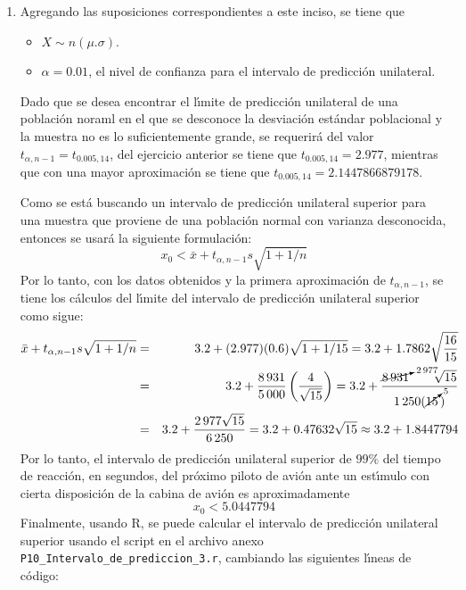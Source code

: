 \begin{solucion}
\begin{enumerate}
  \item Agregando las suposiciones correspondientes a este inciso, se tiene que
  \begin{itemize}
   \item $X \sim n\left( \mu. \sigma \right)$.
   \item $\alpha = 0.01$, el nivel de confianza para el intervalo de predicci\'on unilateral.
  \end{itemize}
  Dado que se desea encontrar el l\'{\i}mite de predicci\'on unilateral de una poblaci\'on noraml en el que se desconoce la desviaci\'on est\'andar poblacional y la muestra no es lo suficientemente grande, se requerir\'a del valor $t_{\alpha,n-1} = t_{0.005,14}$, del ejercicio anterior se tiene que $t_{0.005,14} = 2.977$, mientras que con una mayor aproximaci\'on se tiene que $t_{0.005,14} = 2.1447866879178$.
  \par 
  Como se est\'a buscando un intervalo de predicci\'on unilateral superior para una muestra que proviene de una poblaci\'on normal con varianza desconocida, entonces se usar\'a la siguiente formulaci\'on:
  \begin{equation*}
   x_0 < \bar{x} + t_{\alpha,n-1}s\sqrt{1 + 1/n}
  \end{equation*}
  Por lo tanto, con los datos obtenidos y la primera aproximaci\'on de $t_{\alpha,n-1}$, se tiene los c\'alculos del l\'{\i}mite del intervalo de predicci\'on unilateral superior como sigue:
  \begin{eqnarray*}
   \bar{x} + t_{\alpha,n-1}s\sqrt{1 + 1/n} & = & 3.2 + (2.977)(0.6)\sqrt{1+1/15} = 3.2 + 1.7862\sqrt{\frac{16}{15}} \\
   & = & 3.2 + \frac{8\,931}{5\,000}\left( \frac{4}{\sqrt{15}} \right) = 3.2 + \frac{\cancelto{2\,977}{8\,931} \qquad \sqrt{15}}{1\,250(\cancelto{5}{15}\,)} \\
   & = & 3.2 + \frac{2\,977\sqrt{15}}{6\,250} = 3.2 + 0.47632\sqrt{15} \approx 3.2 + 1.8447794
  \end{eqnarray*}
  Por lo tanto, el intervalo de predicci\'on unilateral superior de $99\%$ del tiempo de reacci\'on, en segundos, del pr\'oximo piloto de avi\'on ante un est\'{\i}mulo con cierta disposici\'on de la cabina de avi\'on es aproximadamente
  \begin{equation*}
   x_0 < 5.0447794
  \end{equation*}
  Finalmente, usando R, se puede calcular el intervalo de predicci\'on unilateral superior usando el script en el archivo anexo \texttt{P10\_Intervalo\_de\_prediccion\_3.r}, cambiando las siguientes l\'{\i}neas de c\'odigo:

\end{enumerate}
\end{solucion}
